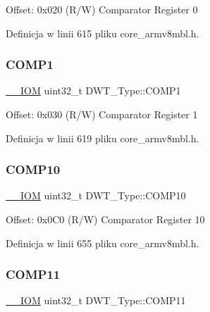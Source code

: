 Offset\+: 0x020 (R/W) Comparator Register 0 

Definicja w linii 615 pliku core\+\_\+armv8mbl.\+h.

\mbox{\label{struct_d_w_t___type_a38714af6b7fa7c64d68f5e1efbe7a931}} 
\subsubsection{\texorpdfstring{C\+O\+M\+P1}{COMP1}}
{\footnotesize\ttfamily \hyperlink{core__sc300_8h_ab6caba5853a60a17e8e04499b52bf691}{\+\_\+\+\_\+\+I\+OM} uint32\+\_\+t D\+W\+T\+\_\+\+Type\+::\+C\+O\+M\+P1}

Offset\+: 0x030 (R/W) Comparator Register 1 

Definicja w linii 619 pliku core\+\_\+armv8mbl.\+h.

\mbox{\label{struct_d_w_t___type_acf26842434e5cd1487a49812ec842d03}} 
\subsubsection{\texorpdfstring{C\+O\+M\+P10}{COMP10}}
{\footnotesize\ttfamily \hyperlink{core__sc300_8h_ab6caba5853a60a17e8e04499b52bf691}{\+\_\+\+\_\+\+I\+OM} uint32\+\_\+t D\+W\+T\+\_\+\+Type\+::\+C\+O\+M\+P10}

Offset\+: 0x0\+C0 (R/W) Comparator Register 10 

Definicja w linii 655 pliku core\+\_\+armv8mbl.\+h.

\mbox{\label{struct_d_w_t___type_aa199b91c854edd21ded38b8922d1e2a7}} 
\subsubsection{\texorpdfstring{C\+O\+M\+P11}{COMP11}}
{\footnotesize\ttfamily \hyperlink{core__sc300_8h_ab6caba5853a60a17e8e04499b52bf691}{\+\_\+\+\_\+\+I\+OM} uint32\+\_\+t D\+W\+T\+\_\+\+Type\+::\+C\+O\+M\+P11}

